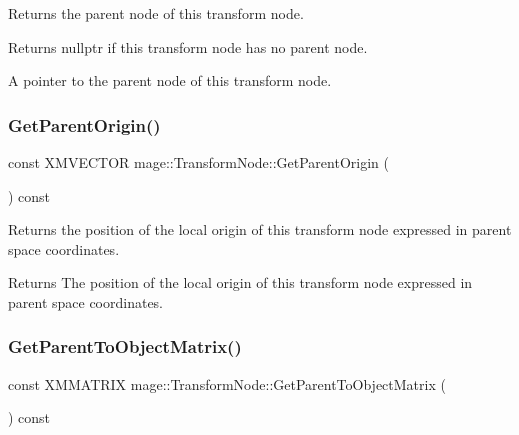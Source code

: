 Returns the parent node of this transform node.

\begin{DoxyReturn}{Returns}
{\ttfamily nullptr} if this transform node has no parent node. 

A pointer to the parent node of this transform node. 
\end{DoxyReturn}
\hypertarget{structmage_1_1_transform_node_a22a853447eaf646db3522e7f4093ae01}{}\label{structmage_1_1_transform_node_a22a853447eaf646db3522e7f4093ae01} 
\subsubsection{\texorpdfstring{Get\+Parent\+Origin()}{GetParentOrigin()}}
{\footnotesize\ttfamily const X\+M\+V\+E\+C\+T\+OR mage\+::\+Transform\+Node\+::\+Get\+Parent\+Origin (\begin{DoxyParamCaption}{ }\end{DoxyParamCaption}) const\hspace{0.3cm}{\ttfamily [noexcept]}}

Returns the position of the local origin of this transform node expressed in parent space coordinates.

\begin{DoxyReturn}{Returns}
The position of the local origin of this transform node expressed in parent space coordinates. 
\end{DoxyReturn}
\hypertarget{structmage_1_1_transform_node_a13efbdabf75f4a26fa8512443d0064f0}{}\label{structmage_1_1_transform_node_a13efbdabf75f4a26fa8512443d0064f0} 
\subsubsection{\texorpdfstring{Get\+Parent\+To\+Object\+Matrix()}{GetParentToObjectMatrix()}}
{\footnotesize\ttfamily const X\+M\+M\+A\+T\+R\+IX mage\+::\+Transform\+Node\+::\+Get\+Parent\+To\+Object\+Matrix (\begin{DoxyParamCaption}{ }\end{DoxyParamCaption}) const\hspace{0.3cm}{\ttfamily [noexcept]}}

